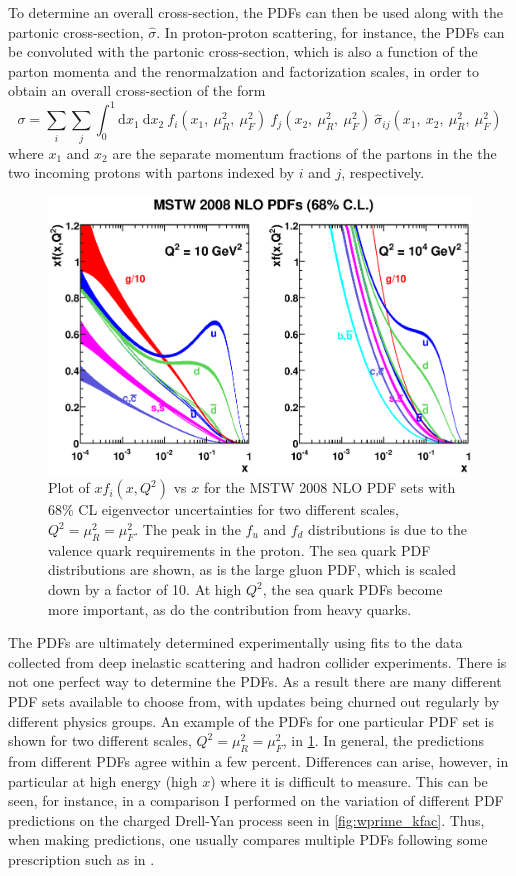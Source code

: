To determine an overall cross-section, 
the PDFs can then be used along with the partonic cross-section,
$\hat{\sigma}$.
In proton-proton scattering, for instance, 
the PDFs can be convoluted with the partonic
cross-section, which is also 
a function of the parton momenta and the renormalzation and factorization
scales, in order to obtain an overall cross-section of the form
\begin{equation}
\sigma = \sum_i \sum_j \int^1_0 \textrm{d}x_1~\textrm{d}x_2~f_i(x_1,~\mu_R^2,~\mu_F^2)~f_j(x_2,~\mu_R^2,~\mu_F^2) ~\hat{\sigma}_{ij}(x_1,~x_2,~\mu_R^2,~\mu_F^2)
\end{equation}
where $x_1$ and $x_2$ are the separate momentum fractions of the partons in the 
the two incoming protons with partons indexed by $i$ and $j$, respectively.


\begin{figure}[ht]
\centering
\includegraphics[width=.9\textwidth]{figures/theory/mstw.eps}
\caption{Plot of $xf_i(x,Q^2)$ vs $x$ for the MSTW 2008 NLO PDF sets \cite{Martin:2009iq} with 68\% CL 
eigenvector uncertainties for two different scales, $Q^2=\mu_R^2=\mu_F^2$.
The peak in the $f_u$ and $f_d$ distributions is due to the valence
quark requirements in the proton. The sea quark PDF distributions are shown,
as is the large gluon PDF, which is scaled down by a factor of 10.  At
high $Q^2$, the sea quark PDFs become more important, as do the 
contribution from heavy quarks.}
\label{fig:pdf_mstw}
\end{figure}


The PDFs are ultimately determined experimentally using fits to the 
data collected from deep inelastic scattering and hadron
collider experiments. There is not one perfect way 
to determine the PDFs.  As a result there are many different
PDF sets available to choose from, with updates being churned
out regularly by different physics groups. An example of the
PDFs for one particular PDF set is shown for two different
scales, $Q^2=\mu_R^2=\mu_F^2$, in \fig\ref{fig:pdf_mstw}.
In general, the predictions from different PDFs agree within a few percent.
Differences can arise, however, in particular at high energy (high $x$)
where it is difficult to measure.
This can be seen, for instance, in a comparison I performed
on the variation of different PDF predictions on the charged Drell-Yan process
seen in \fig\ref{fig:wprime_kfac}.
Thus, when making predictions, one usually compares multiple
PDFs following some prescription such as in \cite{Botje:2011sn}.




